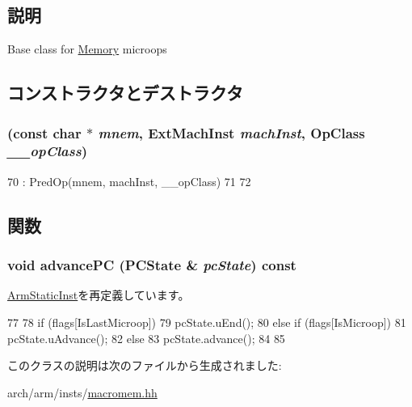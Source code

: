 \subsection{説明}
Base class for \hyperlink{classArmISA_1_1Memory}{Memory} microops 

\subsection{コンストラクタとデストラクタ}
\hypertarget{classArmISA_1_1MicroOp_a4fce46491b629156291132a467e8693e}{
\subsubsection[{MicroOp}]{ (const char $\ast$ {\em mnem}, \/  {\bf ExtMachInst} {\em machInst}, \/  OpClass {\em \_\-\_\-opClass})}}
\label{classArmISA_1_1MicroOp_a4fce46491b629156291132a467e8693e}



\begin{DoxyCode}
70             : PredOp(mnem, machInst, __opClass)
71     {
72     }
\end{DoxyCode}


\subsection{関数}
\hypertarget{classArmISA_1_1MicroOp_af04cd01429462d48e635f3e01ced6257}{
\subsubsection[{advancePC}]{\setlength{\rightskip}{0pt plus 5cm}void advancePC (PCState \& {\em pcState}) const}}
\label{classArmISA_1_1MicroOp_af04cd01429462d48e635f3e01ced6257}


\hyperlink{classArmISA_1_1ArmStaticInst_af04cd01429462d48e635f3e01ced6257}{ArmStaticInst}を再定義しています。


\begin{DoxyCode}
77     {
78         if (flags[IsLastMicroop]) {
79             pcState.uEnd();
80         } else if (flags[IsMicroop]) {
81             pcState.uAdvance();
82         } else {
83             pcState.advance();
84         }
85     }
\end{DoxyCode}


このクラスの説明は次のファイルから生成されました:\begin{DoxyCompactItemize}
\item 
arch/arm/insts/\hyperlink{macromem_8hh}{macromem.hh}\end{DoxyCompactItemize}
